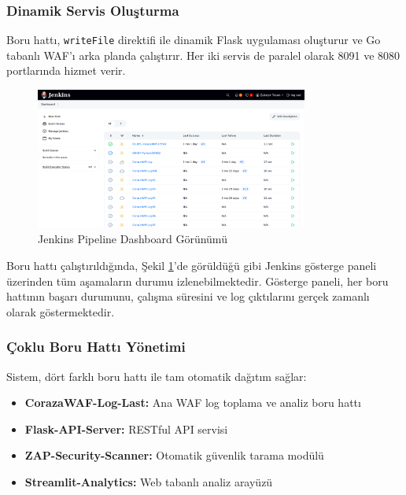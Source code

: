 \subsubsection{Dinamik Servis Oluşturma}

Boru hattı, \texttt{writeFile} direktifi ile dinamik Flask uygulaması oluşturur ve Go tabanlı WAF'ı arka planda çalıştırır. Her iki servis de paralel olarak 8091 ve 8080 portlarında hizmet verir.

\newpage

\begin{figure}[!ht]
    \centering
    \includegraphics[width=0.8\textwidth]{images/jenkins-dashboard.png}
    \caption{Jenkins Pipeline Dashboard Görünümü}
    \label{fig:jenkins_dashboard}
\end{figure}

Boru hattı çalıştırıldığında, Şekil \ref{fig:jenkins_dashboard}'de görüldüğü gibi Jenkins gösterge paneli üzerinden tüm aşamaların durumu izlenebilmektedir. Gösterge paneli, her boru hattının başarı durumunu, çalışma süresini ve log çıktılarını gerçek zamanlı olarak göstermektedir.

\subsubsection{Çoklu Boru Hattı Yönetimi}

Sistem, dört farklı boru hattı ile tam otomatik dağıtım sağlar:

\begin{itemize}
    \item \textbf{CorazaWAF-Log-Last:} Ana WAF log toplama ve analiz boru hattı
    \item \textbf{Flask-API-Server:} RESTful API servisi
    \item \textbf{ZAP-Security-Scanner:} Otomatik güvenlik tarama modülü
    \item \textbf{Streamlit-Analytics:} Web tabanlı analiz arayüzü
\end{itemize}

